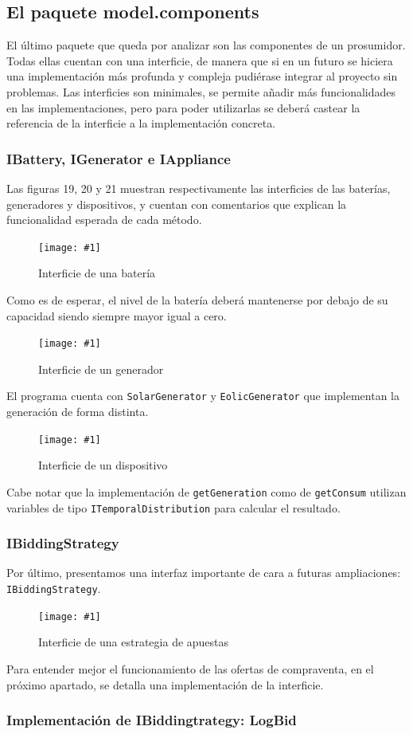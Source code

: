 \documentclass[12pt,a4paper,openright,oneside]{article}
\newcommand{\includeImage}[3]
{
	\begin{figure}[H]
	\begin{center}
	\texttt{[image: \#1]}
	\end{center}
	\caption{#3}
	\end{figure}
}
\numberwithin{equation}{section}
\theoremstyle{definition}
\begin{document}
\subsection{El paquete model.components} 
El último paquete que queda por analizar son las componentes de un prosumidor. Todas ellas cuentan con una interficie, de manera que si en un futuro se hiciera una implementación más profunda y compleja pudiérase integrar al proyecto sin problemas. Las interficies son minimales, se permite añadir más funcionalidades en las implementaciones, pero para poder utilizarlas se deberá castear la referencia de la interficie a la implementación concreta.

\subsubsection{IBattery, IGenerator e IAppliance}
Las figuras 19, 20 y 21 muestran respectivamente las interficies de las baterías, generadores y dispositivos, y cuentan con comentarios que explican la funcionalidad esperada de cada método.

\includeImage{battery.png}{7}{Interficie de una batería}

Como es de esperar, el nivel de la batería deberá mantenerse por debajo de su capacidad siendo siempre mayor igual a cero.

\includeImage{generator.png}{10}{Interficie de un generador}
El programa cuenta con \texttt{SolarGenerator} y \texttt{EolicGenerator} que implementan la generación de forma distinta.
\includeImage{appliance.png}{8}{Interficie de un dispositivo}
Cabe notar que la implementación de \texttt{getGeneration} como de \texttt{getConsum} utilizan variables de tipo \texttt{ITemporalDistribution} para calcular el resultado. 
\subsubsection{IBiddingStrategy}

Por último, presentamos una interfaz importante de cara a futuras ampliaciones: \texttt{IBiddingStrategy}.
\includeImage{bidding.png}{12}{Interficie de una estrategia de apuestas}
Para entender mejor el funcionamiento de las ofertas de compraventa, en el próximo apartado, se detalla una implementación de la interficie.

\subsubsection{Implementación de IBiddingtrategy: LogBid}
\end{document}
